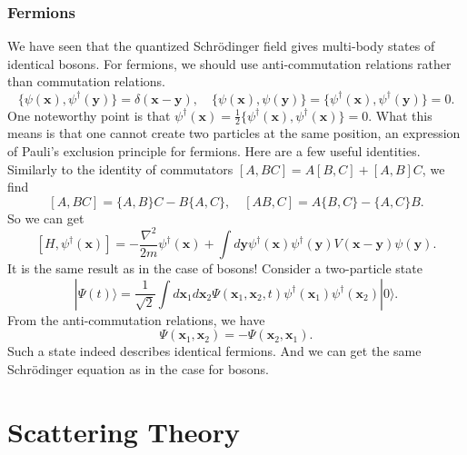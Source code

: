 \subsection{Fermions}
We have seen that the quantized Schr\"{o}dinger field gives multi-body states of identical bosons. For fermions, we should use anti-commutation relations rather than commutation relations.
\[\{\psi(\bm{x}),\psi^{\dagger}(\bm{y})\} = \delta(\bm{x}-\bm{y}) , \quad \{\psi(\bm{x}),\psi(\bm{y})\} = \{\psi^{\dagger}(\bm{x}),\psi^{\dagger}(\bm{y})\} = 0.\]
One noteworthy point is that $\psi^{\dagger}(\bm{x}) = \frac{1}{2}\{\psi^{\dagger}(\bm{x}),\psi^{\dagger}(\bm{x})\} = 0$. 
What this means is that one cannot create two particles at the same position, an expression of Pauli's exclusion principle for fermions.
Here are a few useful identities. Similarly to the identity of commutators $[A,BC] = A[B,C] + [A,B]C$, we find
\[[A,BC] = \{A,B\}C - B\{A,C\} , \quad [AB,C] = A\{B,C\} - \{A,C\}B.\]
So we can get
\[[H,\psi^{\dagger}(\bm{x})] = -\frac{\nabla^2}{2m}\psi^{\dagger}(\bm{x}) + \int d\bm{y} \psi^{\dagger}(\bm{x}) \psi^{\dagger}(\bm{y})V(\bm{x}-\bm{y})\psi(\bm{y}).\]
It is the same result as in the case of bosons!
Consider a two-particle state
\[|\Psi(t)\rangle = \frac{1}{\sqrt{2}} \int d\bm{x}_1 d\bm{x}_2 \Psi(\bm{x}_1,\bm{x}_2,t) \psi^{\dagger}(\bm{x}_1)\psi^{\dagger}(\bm{x}_2) |0\rangle.\]
From the anti-commutation relations, we have
\[\Psi(\bm{x}_1,\bm{x}_2) = - \Psi(\bm{x}_2,\bm{x}_1).\]
Such a state indeed describes identical fermions. And we can get the same Schr\"{o}dinger equation as in the case for bosons.

\chapter{Scattering Theory}
